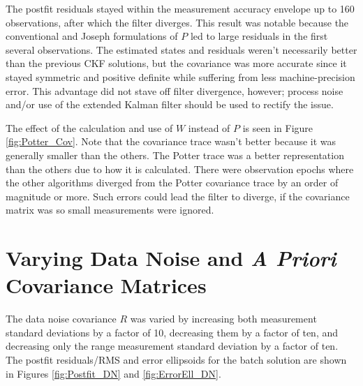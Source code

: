 \documentclass[]{aiaa-tc}%
\begin{document}
	The postfit residuals stayed within the measurement accuracy envelope up to 160 observations, after which the filter diverges.  This result was notable because the conventional and Joseph formulations of $P$ led to large residuals in the first several observations. The estimated states and residuals weren't necessarily better than the previous CKF solutions, but the covariance was more accurate since it stayed symmetric and positive definite while suffering from less machine-precision error. This advantage did not stave off filter divergence, however; process noise and/or use of the extended Kalman filter should be used to rectify the issue.
	
	\vspace{5 mm}

	The effect of the calculation and use of $W$ instead of $P$ is seen in Figure \ref{fig:Potter_Cov}. Note that the covariance trace wasn't better because it was generally smaller than the others. The Potter trace was a better representation than the others due to how it is calculated.  There were observation epochs where the other algorithms diverged from the Potter covariance trace by an order of magnitude or more.  Such errors could lead the filter to diverge, if the covariance matrix was so small measurements were ignored.

	\section{Varying Data Noise and \textit{A Priori} Covariance Matrices}
	
	The data noise covariance $R$ was varied by increasing both measurement standard deviations by a factor of 10, decreasing them by a factor of ten, and decreasing only the range measurement standard deviation by a factor of ten.  The postfit residuals/RMS and error ellipsoids for the batch solution are shown in Figures \ref{fig:Postfit_DN} and \ref{fig:ErrorEll_DN}.
\end{document}
